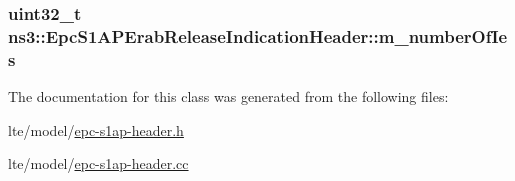 \subsubsection[{\texorpdfstring{m\+\_\+number\+Of\+Ies}{m_numberOfIes}}]{\setlength{\rightskip}{0pt plus 5cm}uint32\+\_\+t ns3\+::\+Epc\+S1\+A\+P\+Erab\+Release\+Indication\+Header\+::m\+\_\+number\+Of\+Ies\hspace{0.3cm}{\ttfamily [private]}}\hypertarget{classns3_1_1EpcS1APErabReleaseIndicationHeader_aa5d8a46828711733ab059df76c2d044d}{}\label{classns3_1_1EpcS1APErabReleaseIndicationHeader_aa5d8a46828711733ab059df76c2d044d}


The documentation for this class was generated from the following files\+:\begin{DoxyCompactItemize}
\item 
lte/model/\hyperlink{epc-s1ap-header_8h}{epc-\/s1ap-\/header.\+h}\item 
lte/model/\hyperlink{epc-s1ap-header_8cc}{epc-\/s1ap-\/header.\+cc}\end{DoxyCompactItemize}
